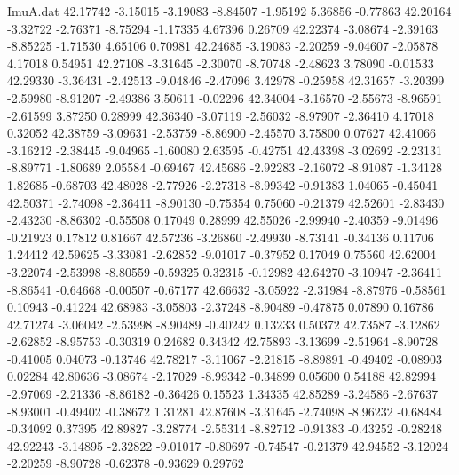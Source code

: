 \begin{filecontents}{ImuA.dat}
  42.17742   -3.15015   -3.19083   -8.84507   -1.95192    5.36856   -0.77863
  42.20164   -3.32722   -2.76371   -8.75294   -1.17335    4.67396    0.26709
  42.22374   -3.08674   -2.39163   -8.85225   -1.71530    4.65106    0.70981
  42.24685   -3.19083   -2.20259   -9.04607   -2.05878    4.17018    0.54951
  42.27108   -3.31645   -2.30070   -8.70748   -2.48623    3.78090   -0.01533
  42.29330   -3.36431   -2.42513   -9.04846   -2.47096    3.42978   -0.25958
  42.31657   -3.20399   -2.59980   -8.91207   -2.49386    3.50611   -0.02296
  42.34004   -3.16570   -2.55673   -8.96591   -2.61599    3.87250    0.28999
  42.36340   -3.07119   -2.56032   -8.97907   -2.36410    4.17018    0.32052
  42.38759   -3.09631   -2.53759   -8.86900   -2.45570    3.75800    0.07627
  42.41066   -3.16212   -2.38445   -9.04965   -1.60080    2.63595   -0.42751
  42.43398   -3.02692   -2.23131   -8.89771   -1.80689    2.05584   -0.69467
  42.45686   -2.92283   -2.16072   -8.91087   -1.34128    1.82685   -0.68703
  42.48028   -2.77926   -2.27318   -8.99342   -0.91383    1.04065   -0.45041
  42.50371   -2.74098   -2.36411   -8.90130   -0.75354    0.75060   -0.21379
  42.52601   -2.83430   -2.43230   -8.86302   -0.55508    0.17049    0.28999
  42.55026   -2.99940   -2.40359   -9.01496   -0.21923    0.17812    0.81667
  42.57236   -3.26860   -2.49930   -8.73141   -0.34136    0.11706    1.24412
  42.59625   -3.33081   -2.62852   -9.01017   -0.37952    0.17049    0.75560
  42.62004   -3.22074   -2.53998   -8.80559   -0.59325    0.32315   -0.12982
  42.64270   -3.10947   -2.36411   -8.86541   -0.64668   -0.00507   -0.67177
  42.66632   -3.05922   -2.31984   -8.87976   -0.58561    0.10943   -0.41224
  42.68983   -3.05803   -2.37248   -8.90489   -0.47875    0.07890    0.16786
  42.71274   -3.06042   -2.53998   -8.90489   -0.40242    0.13233    0.50372
  42.73587   -3.12862   -2.62852   -8.95753   -0.30319    0.24682    0.34342
  42.75893   -3.13699   -2.51964   -8.90728   -0.41005    0.04073   -0.13746
  42.78217   -3.11067   -2.21815   -8.89891   -0.49402   -0.08903    0.02284
  42.80636   -3.08674   -2.17029   -8.99342   -0.34899    0.05600    0.54188
  42.82994   -2.97069   -2.21336   -8.86182   -0.36426    0.15523    1.34335
  42.85289   -3.24586   -2.67637   -8.93001   -0.49402   -0.38672    1.31281
  42.87608   -3.31645   -2.74098   -8.96232   -0.68484   -0.34092    0.37395
  42.89827   -3.28774   -2.55314   -8.82712   -0.91383   -0.43252   -0.28248
  42.92243   -3.14895   -2.32822   -9.01017   -0.80697   -0.74547   -0.21379
  42.94552   -3.12024   -2.20259   -8.90728   -0.62378   -0.93629    0.29762

\end{filecontents}
